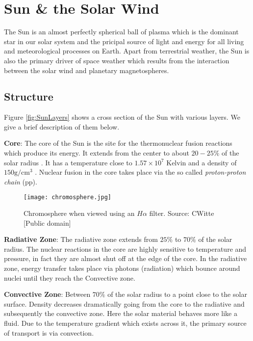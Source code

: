 \section{Sun \& the Solar Wind}\label{sec:solar}

The Sun is an almost perfectly spherical ball of plasma which is the dominant star in our solar system and 
the pricipal source of light and energy for all living and meteorological processes on Earth. Apart from 
terrestrial weather, the Sun is also the primary driver of space weather which results from the interaction 
between the solar wind and planetary magnetospheres.

\subsection{Structure}

Figure \ref{fig:SunLayers} shows a cross section of the Sun with various layers. We give a brief description 
of them below.

\textbf{Core}: The core of the Sun is the site for the thermonuclear fusion reactions which produce its energy. It extends 
from the center to about $20-25\%$ of the solar radius \citep{SolarAct}. It has a temperature close to 
$1.57 \times 10^7$ Kelvin and a density of $150 \text{g}/\text{cm}^3$ \citep{SolarCore}. Nuclear fusion in the core 
takes place via the so called \emph{proton-proton chain} (pp).

\begin{wrapfigure}{r}{0.4\textwidth}
    \centering\texttt{[image: chromosphere.jpg]}
    \caption{
        \small Chromosphere when viewed using an $H\alpha$ filter. Source: CWitte [Public domain]}
    \label{fig:chromosphere}
\end{wrapfigure}

\textbf{Radiative Zone}: The radiative zone extends from $25\%$ to $70\%$ of the solar radius. The nuclear reactions in the core are 
highly sensitive to temperature and pressure, in fact they are almost shut off at the edge of the core. 
In the radiative zone, energy transfer takes place via photons (radiation) which bounce around nuclei until 
they reach the Convective zone.

\textbf{Convective Zone}: Between $70\%$ of the solar radius to a point close to the solar surface. Density decreases dramatically going 
from the core to the radiative and subsequently the convective zone. Here the solar material behaves more 
like a fluid. Due to the temperature gradient which exists across it, the primary source of transport is 
via convection.

